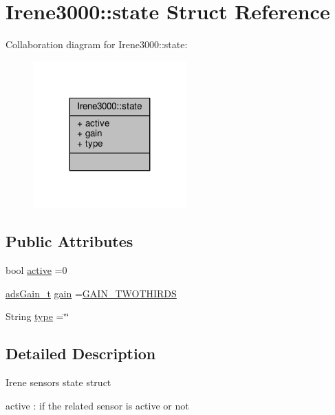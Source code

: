 \hypertarget{struct_irene3000_1_1state}{}\section{Irene3000\+:\+:state Struct Reference}
\label{struct_irene3000_1_1state}


Collaboration diagram for Irene3000\+:\+:state\+:\nopagebreak
\begin{figure}[H]
\begin{center}
\leavevmode
\includegraphics[width=167pt]{d8/d72/struct_irene3000_1_1state__coll__graph}
\end{center}
\end{figure}
\subsection*{Public Attributes}
\begin{DoxyCompactItemize}
\item 
bool \hyperlink{struct_irene3000_1_1state_a879828ace7e7a7bc91ff703bfee36599}{active} =0
\item 
\hyperlink{_cool_adafruit___a_d_s1015_8h_a3d6c0e15829a207b9155890811fa4781}{ads\+Gain\+\_\+t} \hyperlink{struct_irene3000_1_1state_a1ecf69d38cb31ecaf6b3602a3f3e93cb}{gain} =\hyperlink{_cool_adafruit___a_d_s1015_8h_a3d6c0e15829a207b9155890811fa4781a879d688347ec0bf159fe1278db602f68}{G\+A\+I\+N\+\_\+\+T\+W\+O\+T\+H\+I\+R\+DS}
\item 
String \hyperlink{struct_irene3000_1_1state_a9897a7e02727db6351d44006eec73799}{type} =\char`\"{}\char`\"{}
\end{DoxyCompactItemize}


\subsection{Detailed Description}
Irene sensors state struct

active \+: if the related sensor is active or not

